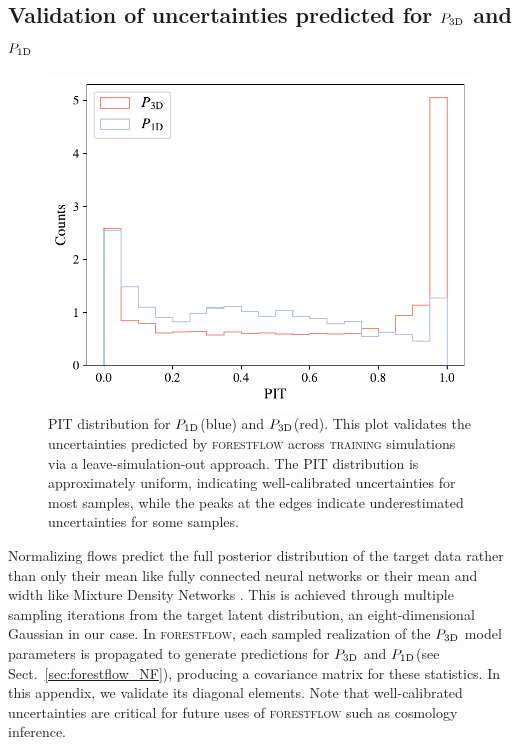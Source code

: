 \documentclass[longauth]{aa}
\newcommand{\poned}{\ensuremath{P_{\rm 1D}}\xspace}
\newcommand{\pthreed}{\ensuremath{P_{\rm 3D}}\xspace}
\newcommand{\forestflow}{\textsc{forestflow}\xspace}
\newcommand{\lacehc}{\textsc{training}\xspace}
\begin{document}
\begin{appendix}

\section{Validation of uncertainties predicted for \pthreed and \poned}
\label{sec:uncertainty_validation}

\begin{figure}
    \centering\includegraphics[width=\columnwidth]{figures/PIT_P3D.pdf}
    \caption{PIT distribution for \poned (blue) and \pthreed (red). This plot validates the uncertainties predicted by \forestflow across \lacehc simulations via a leave-simulation-out approach. The PIT distribution is approximately uniform, indicating well-calibrated uncertainties for most samples, while the peaks at the edges indicate underestimated uncertainties for some samples.}
    \label{fig:PIT}
\end{figure}

Normalizing flows predict the full posterior distribution of the target data rather than only their mean like fully connected neural networks or their mean and width like Mixture Density Networks \citep[see][for some applications in cosmology]{ramachandra2022MachineLearningSynthetic, cabayol-garcia2023NeuralNetworkEmulator}. This is achieved through multiple sampling iterations from the target latent distribution, an eight-dimensional Gaussian in our case. In \forestflow, each sampled realization of the \pthreed model parameters is propagated to generate predictions for \pthreed and \poned (see Sect.~\ref{sec:forestflow_NF}), producing a covariance matrix for these statistics. In this appendix, we validate its diagonal elements. Note that well-calibrated uncertainties are critical for future uses of \forestflow such as cosmology inference.


\end{appendix}
\end{document}
